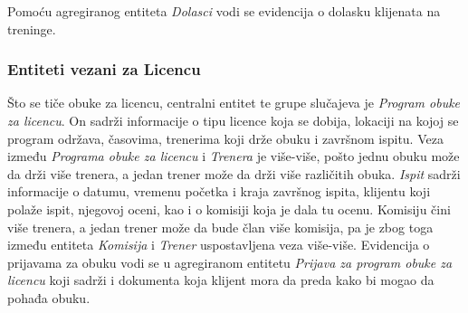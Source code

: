 \documentclass[../main.tex]{subfiles}
\begin{document}
Pomoću agregiranog entiteta \textit{Dolasci} vodi se evidencija o dolasku klijenata na treninge.


\subsubsection{Entiteti vezani za Licencu}
Što se tiče obuke za licencu, centralni entitet te grupe slučajeva je \textit{Program obuke za licencu}. On sadrži informacije o tipu licence koja se dobija, lokaciji na kojoj se program održava, časovima, trenerima koji drže obuku i završnom ispitu. Veza između \textit{Programa obuke za licencu} i \textit{Trenera} je više-više, pošto jednu obuku može da drži više trenera, a jedan trener može da drži više različitih obuka. \textit{Ispit} sadrži informacije o datumu, vremenu početka i kraja završnog ispita, klijentu koji polaže ispit, njegovoj oceni, kao i o komisiji koja je dala tu ocenu. Komisiju čini više trenera, a jedan trener može da bude član više komisija, pa je zbog toga između entiteta \textit{Komisija} i \textit{Trener} uspostavljena veza više-više. Evidencija o prijavama za obuku vodi se u agregiranom entitetu \textit{Prijava za program obuke za licencu} koji sadrži i dokumenta koja klijent mora da preda kako bi mogao da pohađa obuku.
\end{document}
